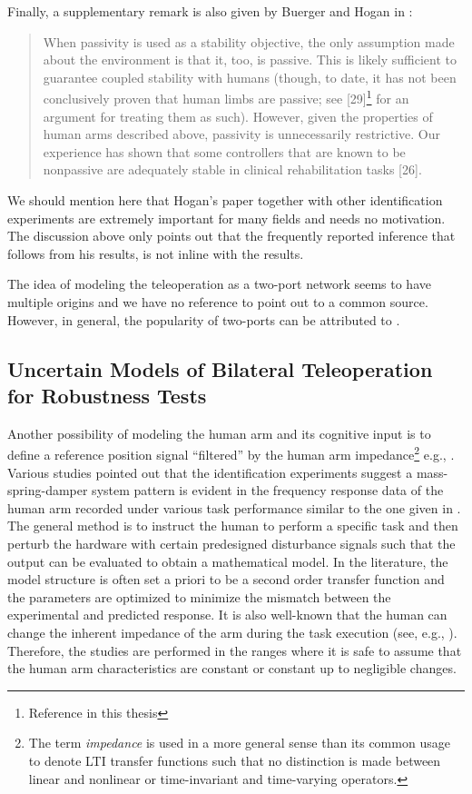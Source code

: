 \noindent Finally, a supplementary remark is also given by Buerger and Hogan in \cite{buergerhogan1}: 
\begin{quote}
When passivity is used as a stability objective, the only assumption
made about the environment is that it, too, is passive.
This is likely sufficient to guarantee coupled stability with humans
(though, to date, it has not been conclusively proven that
human limbs are passive; see [29]\footnote{Reference \cite{hogan89} in this thesis} for an argument for treating
them as such). However, given the properties of human arms
described above, passivity is unnecessarily restrictive. Our experience
has shown that some controllers that are known to be
nonpassive are adequately stable in clinical rehabilitation tasks [26].
\end{quote}


We should mention here that Hogan's paper together with other identification experiments are extremely important for many
fields and needs no motivation. The discussion above only points out that the frequently reported inference that follows from 
his results, is not inline with the results. 

The idea of modeling the teleoperation as a two-port network seems to have multiple origins and we have no reference to 
point out to a common source. However, in general, the popularity of two-ports can be attributed to 
\cite{andersonspong,nieslotine,rajuphd,hannaford89,yokokohjiyoshikawa}. 



\subsection{Uncertain Models of Bilateral Teleoperation for Robustness Tests}\label{sec:lit:uncmodel}

Another possibility of modeling the human arm and its cognitive input is to define a reference position signal \enquote{filtered} by the 
human arm impedance\footnote{The term \emph{impedance} is used in a more general sense than its common usage to denote
LTI transfer functions such that no distinction is made between linear and nonlinear or time-invariant and time-varying 
operators.} e.g., \cite{leelee,kazeroonitsay}. Various studies pointed out that the identification experiments suggest a 
mass-spring-damper system pattern is evident in the frequency response data of the human arm recorded under various task 
performance similar to the one given in \cite{hogan89}. The general method is to instruct the human to perform a specific 
task and then perturb the hardware with certain predesigned disturbance signals such that the output can be evaluated to obtain 
a mathematical model. In the literature, the model structure is often set a priori to be a second order transfer function and 
the parameters are optimized to minimize the mismatch between the experimental and predicted response. It is also well-known 
that the human can change the inherent impedance of the arm during the task execution (see, e.g., \cite{tsujimorasso}). 
Therefore, the studies are performed in the ranges where it is safe to assume that the human arm characteristics are constant 
or constant up to negligible changes. 


